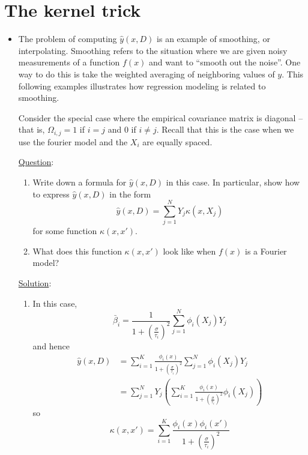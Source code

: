 \section{The kernel trick}
\begin{itemize}
\item The problem of computing $\hat{y}(x,D)$ is an example of smoothing, or interpolating. Smoothing refers to the situation where we are given noisy measurements of a function $f(x)$ and want to ``smooth out the noise''. One way to do this is take the weighted averaging of neighboring values of $y$. This following examples illustrates how regression modeling is related to smoothing. 


\begin{example}
Consider the special case where the empirical covariance matrix is diagonal -- that is, $\Omega_{i,j} = 1$ if $i=j$ and $0$ if $i\ne j$. Recall that this is the case when we use the fourier model and the $X_i$ are equally spaced. 


\noindent 
\underline{Question}: 
\begin{enumerate}[label=(\alph*)]
\item Write down a formula for $\hat{y}(x,D)$ in this case. In particular, show how to express $\hat{y}(x,D)$ in the form 
\begin{equation}\label{eq:hatykernel}
\hat{y}(x,D) = \sum_{j=1}^NY_j\kappa(x,X_j)
\end{equation}
for some function $\kappa(x,x')$. 
\item What does this function $\kappa(x,x')$ look like when $f(x)$ is a Fourier model?  \\
\end{enumerate}


\noindent 
\underline{Solution}:

\begin{enumerate}[label=(\alph*)]
\item In this case, 
\begin{equation*}
\bar{\beta}_i = \frac{1}{1 + \left(\frac{\sigma}{\tau_i} \right)^2}\sum_{j=1}^N\phi_i(X_j)Y_j
\end{equation*}
and hence 
\begin{align*}
\hat{y}(x,D) &=  \sum_{i=1}^K\frac{\phi_i(x)}{1 + \left(\frac{\sigma}{\tau_i} \right)^2}\sum_{j=1}^N\phi_i(X_j)Y_j\\
&= \sum_{j=1}^NY_j\left( \sum_{i=1}^K\frac{\phi_i(x)}{1 + \left(\frac{\sigma}{\tau_i} \right)^2}\phi_i(X_j)\right)
\end{align*}
so 
\begin{equation*}
\kappa(x,x') = \sum_{i=1}^K\frac{\phi_i(x)\phi_i(x')}{1 + \left(\frac{\sigma}{\tau_i} \right)^2}
\end{equation*}


\end{enumerate}
\end{example}
\end{itemize}
